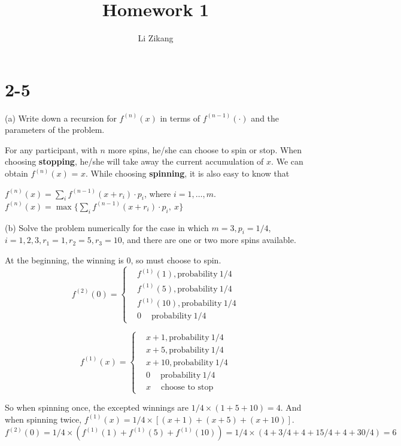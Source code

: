 \documentclass[UTF8]{article}
\author {Li Zikang}
\title {Homework 1}
\date{}
\begin{document}
    \maketitle
\section*{2-5} (a) Write down a recursion for $f^{(n)} (x)$ in terms of $f^{(n-1)} (\cdot)$ and the parameters of the problem.
    \large

    For any participant, with $n$ more spins, he/she can choose to spin or stop. When choosing \textbf{stopping}, he/she will take away the  current accumulation of $x$. We can obtain $f^{(n)} (x)$ = $x$. While choosing \textbf{spinning}, it is also easy to know that

    $ f^{(n)}(x)= \sum_{i} f^{(n-1)}(x+r_i)\cdot p_i$, where $i = 1,\ldots,m.$\\

    $ f^{(n)}(x)= \max\{\sum_{i} f^{(n-1)}(x+r_i)\cdot p_i, ~x\}$

    \normalsize
    (b) Solve the problem numerically for the case in which $m=3, p_i = 1/4$,  $i = 1,2,3, r_1 =1, r_2 =5, r_3 =10$, and there are one or two more spins available.

    \large
    At the beginning, the winning is $0$, so must choose to spin.
    $$ f^{(2)}(0)=\left\{
    \begin{aligned}
    & f^{(1)}(1), \text{probability} ~1/4 \\
    & f^{(1)}(5), \text{probability} ~1/4 \\
    & f^{(1)}(10), \text{probability} ~1/4 \\
    & 0 ~\quad \text{probability} ~1/4
    \end{aligned}
    \right.
    $$

    $$ f^{(1)}(x)=\left\{
    \begin{aligned}
    & x+1, \text{probability} ~1/4 \\
    & x+5, \text{probability} ~1/4 \\
    & x+10, \text{probability} ~1/4 \\
    & 0 ~\quad \text{probability} ~1/4 \\
    & x ~\quad \text{choose to stop}
    \end{aligned}
    \right.
    $$

So when spinning once, the excepted winnings are $1/4 \times (1+5+10)=4$. And when spinning twice, $f^{(1)}(x) = 1/4 \times [(x+1)+(x+5)+(x+10)]$. $f^{(2)}(0) =1/4 \times (f^{(1)}(1)+f^{(1)}(5)+f^{(1)}(10))= 1/4 \times (4+3/4+4+15/4+4+30/4) = 6$
\end{document}
